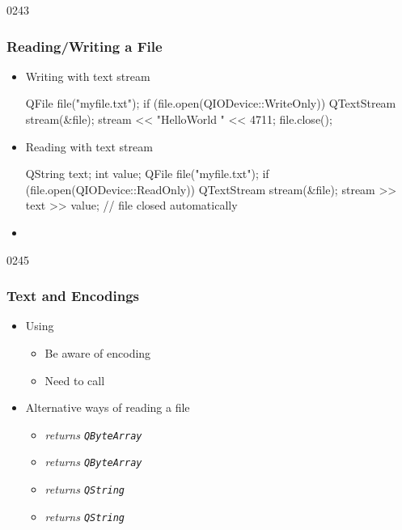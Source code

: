 \begin{slide}[fragile]{0243}
\frametitle{Reading/Writing a File}\label{streaming_to_files}
\begin{itemize}
  \item Writing with text stream
    \begin{cpp}
QFile file("myfile.txt");
if (file.open(QIODevice::WriteOnly)) {
  QTextStream stream(&file);
  stream << "HelloWorld " << 4711;
  file.close();
}
    \end{cpp}     
  \item Reading with text stream
    \begin{cpp}
{
  QString text; int value;
  QFile file("myfile.txt");
  if (file.open(QIODevice::ReadOnly)) {
    QTextStream stream(&file);
    stream >> text >> value;
  }
} // file closed automatically
    \end{cpp}    
  \item {}
  \end{itemize}
\end{slide}

\begin{slide}{0245}\frametitle{Text and Encodings}
\begin{itemize}
  \item Using 
  \begin{itemize}
    \item Be aware of encoding
    \item Need to call 
  \end{itemize}
  \item Alternative ways of reading a file
    \begin{itemize}
    \item {} \emph{returns \texttt{QByteArray} }
    \item {} \emph{returns \texttt{QByteArray} }
    \item {} \emph{returns \texttt{QString} }
    \item {} \emph{returns \texttt{QString} }
    \end{itemize}
  \end{itemize}
\end{slide}


